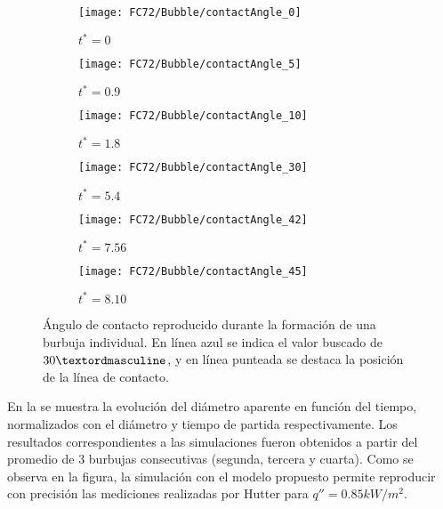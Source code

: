 \begin{figure}[htb]
    \centering
    \begin{subfigure}[t]{0.45\textwidth}
        \centering
        \texttt{[image: FC72/Bubble/contactAngle\_0]}
        \caption{$t^*=0$}
    \end{subfigure}
    \vspace{3mm}
    \begin{subfigure}[t]{0.45\textwidth}
        \centering
        \texttt{[image: FC72/Bubble/contactAngle\_5]}
        \caption{$t^*=0.9$}
    \end{subfigure}
    \begin{subfigure}[t]{0.45\textwidth}
        \centering
        \texttt{[image: FC72/Bubble/contactAngle\_10]}
        \caption{$t^*=1.8$}
    \end{subfigure}
    \vspace{3mm}    
    \begin{subfigure}[t]{0.45\textwidth}
        \centering
        \texttt{[image: FC72/Bubble/contactAngle\_30]}
        \caption{$t^*=5.4$}
    \end{subfigure}
    \begin{subfigure}[t]{0.45\textwidth}
        \centering
        \texttt{[image: FC72/Bubble/contactAngle\_42]}
        \caption{$t^*=7.56$}
    \end{subfigure}
    \begin{subfigure}[t]{0.45\textwidth}
        \centering
        \texttt{[image: FC72/Bubble/contactAngle\_45]}
        \caption{$t^*=8.10$}
    \end{subfigure}            
    \caption{\'Angulo de contacto reproducido durante la formaci\'on de una burbuja individual. En l\'inea azul se indica el valor buscado de $30\textordmasculine$, y en l\'inea punteada se destaca la posici\'on de la l\'inea de contacto.}
    \label{fig:evolucion_contacto}
\end{figure}
\FloatBarrier 

En la  se muestra la evoluci\'on del di\'ametro aparente en funci\'on del tiempo, normalizados con el di\'ametro y tiempo de partida respectivamente. Los resultados correspondientes a las simulaciones fueron obtenidos a partir del promedio de 3 burbujas consecutivas (segunda, tercera y cuarta). Como se observa en la figura, la simulaci\'on con el modelo propuesto permite reproducir con precisi\'on las mediciones realizadas por Hutter para $q'' = 0.85kW/m^2$.


